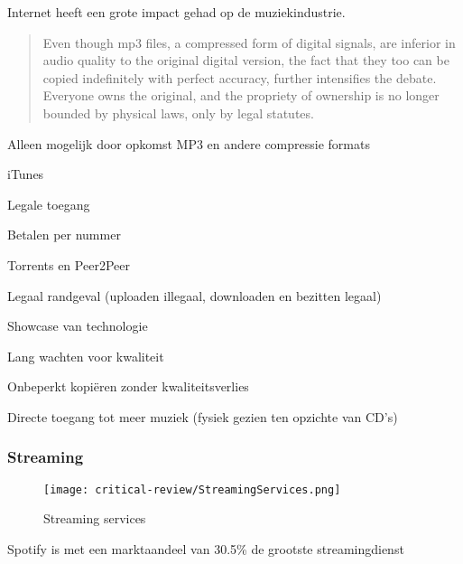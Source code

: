 Internet heeft een grote impact gehad op de muziekindustrie.

\begin{quotation}
    Even though mp3 files, a compressed form of digital signals, are inferior in audio quality to the original digital version, the fact that they too can be copied indefinitely with perfect accuracy, further intensifies the debate. Everyone owns the original, and the propriety of ownership is no longer bounded by physical laws, only by legal statutes.
\end{quotation}
\cite{lansky2004importance}


\begin{todolist}
    \item Alleen mogelijk door opkomst MP3 en andere compressie formats
    \item iTunes \begin{todolist}
        \item Legale toegang
        \item Betalen per nummer
    \end{todolist}
    \item Torrents en Peer2Peer \begin{todolist}
        \item Legaal randgeval (uploaden illegaal, downloaden en bezitten legaal)
        \item Showcase van technologie
        \item Lang wachten voor kwaliteit
    \end{todolist}
    \item Onbeperkt kopiëren zonder kwaliteitsverlies
    \item Directe toegang tot meer muziek (fysiek gezien ten opzichte van CD's)
\end{todolist}

\subsubsection*{Streaming}
\begin{wrapfigure}{r}{0.25\textwidth}
    \centering
    \texttt{[image: critical-review/StreamingServices.png]}
    \caption{Streaming services}
    \label{fig:critical-review:StreamingServices}
\end{wrapfigure}


Spotify is met een marktaandeel van 30.5\% \cite{mulligan2022marketshares} de grootste streamingdienst 

